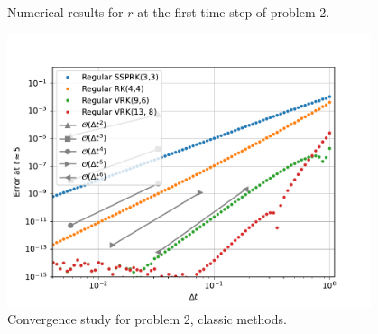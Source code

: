 \documentclass{report}
\begin{document}
    \begin{figure}[H]
        \centering
        \hfill
        \hfill
        \caption{Numerical results for \(r\) at the first time step of problem 2.} \label{Fig3}
    \end{figure}

    \begin{figure}[H]
        \centering
        \includegraphics[width=0.95\textwidth]{figs/P2_Regular_RK4.pdf}
        \caption{Convergence study for problem 2, classic methods.}
        \label{Fig4a}
    \end{figure}
\end{document}
